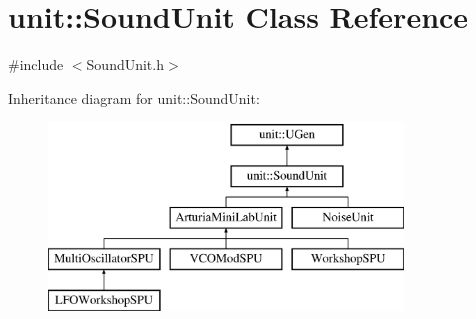 \hypertarget{classunit_1_1SoundUnit}{}\section{unit\+:\+:Sound\+Unit Class Reference}
\label{classunit_1_1SoundUnit}


{\ttfamily \#include $<$Sound\+Unit.\+h$>$}

Inheritance diagram for unit\+:\+:Sound\+Unit\+:\begin{figure}[H]
\begin{center}
\leavevmode
\includegraphics[height=5.000000cm]{classunit_1_1SoundUnit}
\end{center}
\end{figure}
